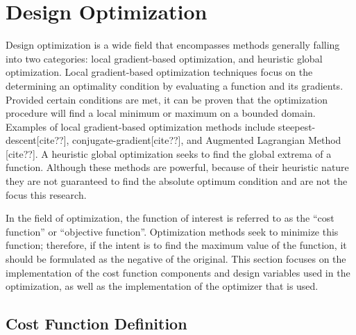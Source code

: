 \chapter{Design Optimization}
\label{chapter-three}

Design optimization is a wide field that encompasses methods generally falling into
two categories: local gradient-based optimization, and heuristic global
optimization.  Local gradient-based optimization techniques focus on the
determining an optimality condition by evaluating a function and its gradients.
Provided certain conditions are met, it can be proven that the optimization
procedure will find a local minimum or maximum on a bounded domain.  Examples of
local gradient-based optimization methods include steepest-descent[cite??],
conjugate-gradient[cite??], and Augmented Lagrangian Method [cite??].  A
heuristic global optimization seeks to find the global extrema of a function.
Although these methods are powerful, because of their heuristic nature they are
not guaranteed to find the absolute optimum condition and are not the focus this
research.

In the field of optimization, the function of interest is referred to as the
``cost function'' or ``objective function''.  Optimization methods seek to
minimize this function; therefore, if the intent is to find the maximum value
of the function, it should be formulated as the negative of the original.  This
section focuses on the implementation of the cost function components and design
variables used in the optimization, as well as the implementation of the
optimizer that is used.

\section{Cost Function Definition}


